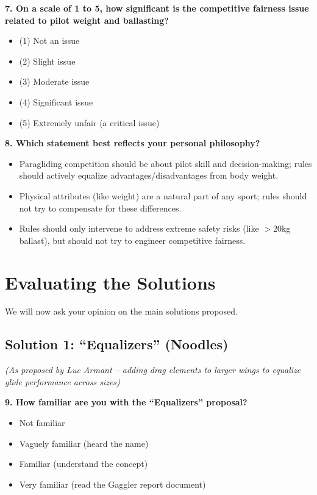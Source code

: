 \documentclass[11pt,a4paper]{article}
\begin{document}
\textbf{7. On a scale of 1 to 5, how significant is the competitive fairness issue related to pilot weight and ballasting?}
\begin{itemize}[label={}]
    \item (1) Not an issue
    \item (2) Slight issue
    \item (3) Moderate issue
    \item (4) Significant issue
    \item (5) Extremely unfair (a critical issue)
\end{itemize}

\textbf{8. Which statement best reflects your personal philosophy?}
\begin{itemize}[label=$\square$]
    \item Paragliding competition should be about pilot skill and decision-making; rules should actively equalize advantages/disadvantages from body weight.
    \item Physical attributes (like weight) are a natural part of any sport; rules should not try to compensate for these differences.
    \item Rules should only intervene to address extreme safety risks (like $>$20kg ballast), but should not try to engineer competitive fairness.
\end{itemize}

\section{Evaluating the Solutions}

We will now ask your opinion on the main solutions proposed.

\subsection{Solution 1: ``Equalizers'' (Noodles)}

\textit{(As proposed by Luc Armant -- adding drag elements to larger wings to equalize glide performance across sizes)}

\textbf{9. How familiar are you with the ``Equalizers'' proposal?}
\begin{itemize}[label=$\square$]
    \item Not familiar
    \item Vaguely familiar (heard the name)
    \item Familiar (understand the concept)
    \item Very familiar (read the Gaggler report document)
\end{itemize}
\end{document}
